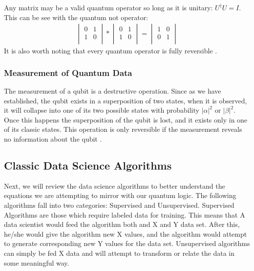 \documentclass[conference]{IEEEtran}
\begin{document}
Any matrix may be a valid quantum operator so long as it is unitary: $U^\dagger U = I$. This can be see with the quantum not operator: 
\begin{align*}
    \begin{vmatrix}
    0 & 1 \\
    1 & 0 \\
    \end{vmatrix} * \begin{vmatrix}
    0 & 1 \\
    1 & 0 \\
    \end{vmatrix} =
    \begin{vmatrix}
    1 & 0 \\
    0 & 1 \\
    \end{vmatrix}
\end{align*}
It is also worth noting that every quantum operator is fully reversible \cite{b9}.
\subsubsection{Measurement of Quantum Data}
The measurement of a qubit is a destructive operation. Since as we have established, the qubit exists in a superposition of two states, when it is observed, it will collapse into one of its two possible states with probability $|\alpha|^2$ or $|\beta|^2$. Once this happens the superposition of the qubit is lost, and it exists only in one of its classic states. This operation is only reversible if the measurement reveals no information about the qubit \cite{b9}. 

\subsection{Classic Data Science Algorithms}
Next, we will review the data science algorithms to better understand the equations we are attempting to mirror with our quantum logic. The following algorithms fall into two categories: Supervised and Unsupervised. Supervised Algorithms are those which require labeled data for training. This means that A data scientist would feed the algorithm both and X and Y data set. After this, he/she would give the algorithm new X values, and the algorithm would attempt to generate corresponding new Y values for the data set. Unsupervised algorithms can simply be fed X data and will attempt to transform or relate the data in some meaningful way. 
\end{document}
